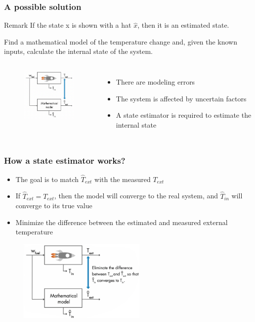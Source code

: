 \documentclass{beamer}
\begin{document}
\begin{frame}
	\frametitle{A possible solution}
	\begin{block}{Remark}
		If the state x is shown with a hat $\hat{x}$, then it is an estimated state. 
	\end{block}
Find a mathematical model of the temperature change and, given the known inputs, calculate the internal state of the system.
	\begin{columns}
		
			\begin{figure}
				\centering
				\includegraphics[width=3.5cm]{T_observer_solution.png}
			\end{figure}
		\begin{itemize}
			\item There are modeling errors
			\item The system is affected by uncertain factors
			\item A state estimator is required to estimate the internal state
		\end{itemize}
		\end{columns}
\end{frame}

\begin{frame}
	\frametitle{How a state estimator works?}
	\begin{itemize}
		\item  The goal is to match $\hat{T}_{ext}$ with the measured $T_{ext}$
		\item If $\hat{T}_{ext}=T_{ext}$, then the model will converge to the real system, and $\hat{T}_{in}$ will converge to its true value
		\item Minimize the difference between the estimated and measured external temperature
	\end{itemize}
	\begin{figure}
		\centering
		\includegraphics[width=6.2cm]{T_fbcontrol.png}
	\end{figure}
\end{frame}
\end{document}
